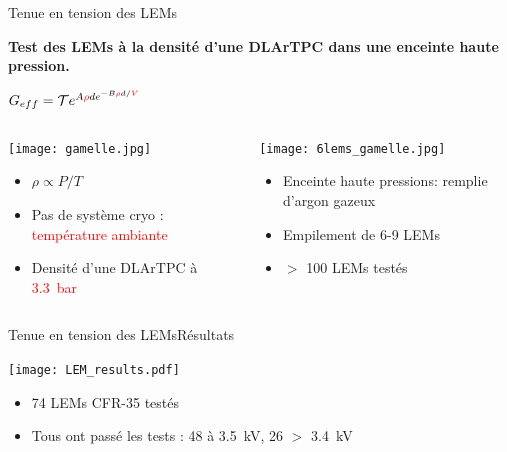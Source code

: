     \begin{frame}{Tenue en tension des LEMs}
    	\begin{scriptsize}
    		\begin{center}
    			\textbf{Test des LEMs à la densité d'une DLArTPC dans une enceinte haute pression.}\\
    			\begin{normalsize}
        			$G _{eff}= \mathcal{T}e^{A\textcolor{red}{\rho} d e^{-B\textcolor{red}{\rho}d/\textcolor{red}{V}}}$
    			\end{normalsize}
    		\end{center} 
    		\begin{columns}
		    	\begin{column}{0.5\textwidth}
		    		\texttt{[image: gamelle.jpg]}\\
		    		\begin{itemize}
		    			\item $\rho \propto P/T$
		    			\item Pas de système cryo : \textcolor{red}{température ambiante}
		    			\item Densité d'une DLArTPC à \textcolor{red}{\SI{3.3}{\bar}}
		    		\end{itemize}
		    	\end{column}\hfill
		    	\begin{column}{0.5\textwidth}
		    		\texttt{[image: 6lems\_gamelle.jpg]}\\
		    		\begin{itemize}
		    			\item Enceinte haute pressions: remplie d'argon gazeux
		    			\item Empilement de 6-9 LEMs
		    			\item $>$ 100 LEMs testés
		    		\end{itemize}
		    	\end{column}
		    \end{columns}
	    \end{scriptsize} 
    \end{frame}
    
    \begin{frame}{Tenue en tension des LEMs}{Résultats}
        \begin{scriptsize}
            \centering\texttt{[image: LEM\_results.pdf]}\\
            \begin{itemize}
                \item 74 LEMs CFR-35 testés
                \item Tous ont passé les tests : 48 à \SI{3.5}{\kilo\volt}, 26 $>$ \SI{3.4}{\kilo\volt} 
            \end{itemize}
        \end{scriptsize}
    \end{frame}

